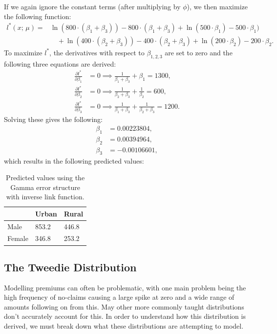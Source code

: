 \documentclass{article}
\begin{document}
If we again ignore the constant terms (after multiplying by $\phi$), we then maximize the following function:
\begin{align}
    l^*(x;\,\mu) = &\ln{(800\cdot(\beta_1+\beta_3))} - 800\cdot(\beta_1+\beta_3) + 
    \ln{(500\cdot\beta_1)} - 500\cdot\beta_1) \nonumber\\
    &\quad+ \ln{(400\cdot(\beta_2+\beta_3))} - 400\cdot(\beta_2+\beta_3) + \ln{(200\cdot\beta_2)} - 200\cdot\beta_2.
\end{align}
To maximize $l^*$, the derivatives with respect to $\beta_{1,2,3}$ are set to zero and the following three equations are derived:
\begin{align}
    \frac{\partial l^*}{\partial\beta_1} &= 0 \implies \frac{1}{\beta_1+\beta_3}+\beta_1 = 1300,\\
    \frac{\partial l^*}{\partial\beta_2} &= 0 \implies \frac{1}{\beta_2+\beta_3}+\frac{1}{\beta_2}=600,\\
    \frac{\partial l^*}{\partial\beta_3} &= 0 \implies \frac{1}{\beta_1+\beta_3}+\frac{1}{\beta_2+\beta_3}=1200.
\end{align}
Solving these gives the following:
\begin{align}
    \beta_1 &= 0.00223804,\\
    \beta_2 &= 0.00394964,\\
    \beta_3 &= -0.00106601,
\end{align}
which results in the following predicted values:
\begin{table}[H]
\centering
\begin{tabular}{l|l|l|}
\cline{2-3}
                             & Urban & Rural \\ \hline
\multicolumn{1}{|l|}{Male}   & 853.2   & 446.8   \\ \hline
\multicolumn{1}{|l|}{Female} & 346.8   & 253.2   \\ \hline
\end{tabular}
    \caption{Predicted values using the Gamma error structure with inverse link function.}
    \label{fig:covariances_example_3}
\end{table}

\subsection{The Tweedie Distribution}\label{sec:tweedie}

Modelling premiums can often be problematic, with one main problem being the high frequency of no-claims causing a large spike at zero and a wide range of amounts following on from this. May other more commonly taught distributions don't accurately account for this. In order to understand how this distribution is derived, we must break down what these distributions are attempting to model.
\end{document}
